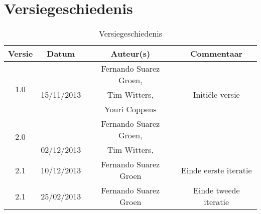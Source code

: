 \chapter{Versiegeschiedenis}

\begin{table}[htbp]
	\centering
	\begin{tabular} {|c|c|c|c|}
	    \hline
				\textbf{Versie} & \textbf{Datum} & \textbf{Auteur(s)} & \textbf{Commentaar} \\
		\hline
		\multirow{3}{*}{1.0 }   &  & Fernando Suarez Groen, &  \\
		                        & 15/11/2013  & Tim Witters,  & Initi\"{e}le versie\\
		                        &   & Youri Coppens & \\ 
		\hline
		\multirow{2}{*}{2.0 }   &  & Fernando Suarez Groen, &  \\
		                        & 02/12/2013  & Tim Witters, & \\ 
		\hline
		\multirow{1}{*}{2.1 }   & 10/12/2013  & Fernando Suarez Groen  & Einde eerste iteratie\\
		\hline
		\multirow{1}{*}{2.1 }   & 25/02/2013  & Fernando Suarez Groen  & Einde tweede iteratie\\ \hline
		                        
	\end{tabular}
	\caption{Versiegeschiedenis}
\end{table}